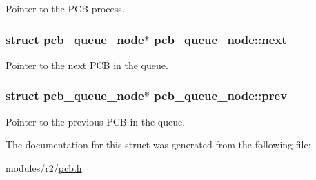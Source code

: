Pointer to the P\+CB process. 

\subsubsection[{\texorpdfstring{next}{next}}]{\setlength{\rightskip}{0pt plus 5cm}struct {\bf pcb\+\_\+queue\+\_\+node}$\ast$ pcb\+\_\+queue\+\_\+node\+::next}\hypertarget{structpcb__queue__node_a6634871cb99f4f53fed51e9b51f6852c}{}\label{structpcb__queue__node_a6634871cb99f4f53fed51e9b51f6852c}


Pointer to the next P\+CB in the queue. 

\subsubsection[{\texorpdfstring{prev}{prev}}]{\setlength{\rightskip}{0pt plus 5cm}struct {\bf pcb\+\_\+queue\+\_\+node}$\ast$ pcb\+\_\+queue\+\_\+node\+::prev}\hypertarget{structpcb__queue__node_aff49de430038d879a5a58105aa1544d5}{}\label{structpcb__queue__node_aff49de430038d879a5a58105aa1544d5}


Pointer to the previous P\+CB in the queue. 



The documentation for this struct was generated from the following file\+:\begin{DoxyCompactItemize}
\item 
modules/r2/\hyperlink{pcb_8h}{pcb.\+h}\end{DoxyCompactItemize}
